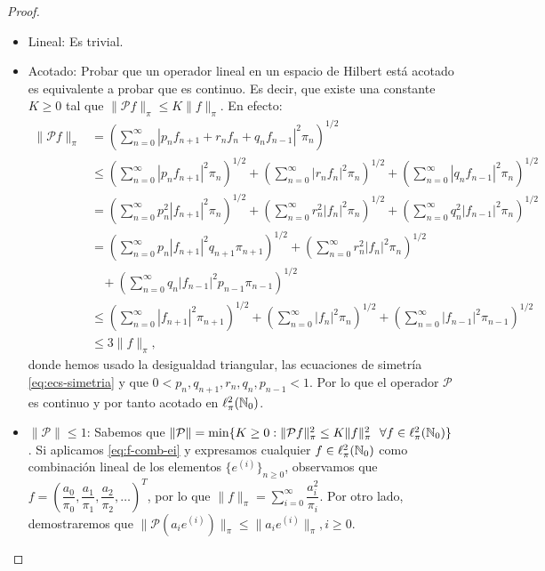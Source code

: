 \begin{proof}
\begin{itemize}
            \item Lineal: Es trivial.
            \item Acotado: Probar que un operador lineal en un espacio de Hilbert está acotado es equivalente a probar que es continuo. Es decir, que existe una constante $K\geq 0$ tal que $\|\mathcal P f\|_\pi\leq K\|f\|_\pi$. En efecto:
            \begin{equation*}
                \begin{split}
                    \|\mathcal P f\|_\pi &= \left(\sum_{n=0}^\infty |p_n f_{n+1} + r_n f_n + q_n f_{n-1}|^2 \pi_n\right)^{1/2} \\
                    &\leq \left(\sum_{n=0}^\infty |p_n f_{n+1}|^2\pi_n\right)^{1/2} + \left(\sum_{n=0}^\infty |r_n f_{n}|^2\pi_n\right)^{1/2} + \left(\sum_{n=0}^\infty |q_n f_{n-1}|^2\pi_n\right)^{1/2}  \\
                    &= \left(\sum_{n=0}^\infty p_n^2 |f_{n+1}|^2\pi_n\right)^{1/2} + \left(\sum_{n=0}^\infty r_n^2 |f_{n}|^2\pi_n\right)^{1/2} + \left(\sum_{n=0}^\infty q_n^2 |f_{n-1}|^2\pi_n\right)^{1/2}  \\
                    &= \left(\sum_{n=0}^\infty p_n |f_{n+1}|^2q_{n+1}\pi_{n+1}\right)^{1/2} + \left(\sum_{n=0}^\infty r_n^2 |f_{n}|^2\pi_n\right)^{1/2} \\ &\ \ \ \ + \left(\sum_{n=0}^\infty q_n |f_{n-1}|^2p_{n-1}\pi_{n-1}\right)^{1/2} \\
                    &\leq \left(\sum_{n=0}^\infty |f_{n+1}|^2\pi_{n+1}\right)^{1/2} + \left(\sum_{n=0}^\infty |f_{n}|^2\pi_n\right)^{1/2} + \left(\sum_{n=0}^\infty |f_{n-1}|^2\pi_{n-1}\right)^{1/2} \\
                    &\leq 3  \|f\|_\pi,
                \end{split}
            \end{equation*}
            donde hemos usado la desigualdad triangular, las ecuaciones de simetría \eqref{eq:ecs-simetria} y que $0 <p_n,q_{n+1},r_n,q_n,p_{n-1}<1$. Por lo que el operador $\mathcal P$ es continuo y por tanto acotado en $\ell^2_\pi(\mathbb{N}_0)$.
            
            \item $\|\mathcal P\|\leq 1$: Sabemos que $\|\mathcal P\|= \min\{K\geq 0: \|\mathcal P f\|_\pi^2\leq K\|f\|^2_\pi \ \ \forall f\in\ell^2_\pi(\mathbb{N}_0) \}$. Si aplicamos \eqref{eq:f-comb-ei} y expresamos cualquier $f\in\ell^2_\pi(\mathbb{N}_0)$ como combinación lineal de los elementos $\{e^{(i)}\}_{n\geq 0}$, observamos que $f =\left(\dfrac{a_0}{\pi_0},\dfrac{a_1}{\pi_1},\dfrac{a_2}{\pi_2},\dots\right)^T$, por lo que $\|f\|_\pi=\displaystyle\sum_{i=0}^\infty\dfrac{a_i^2}{\pi_i}$. Por otro lado, demostraremos que $\|\mathcal{P}\left(a_i e^{(i)}\right)\|_\pi\leq \|a_i e^{(i)}\|_\pi, i\geq 0$.
            

\end{itemize}
\end{proof}
